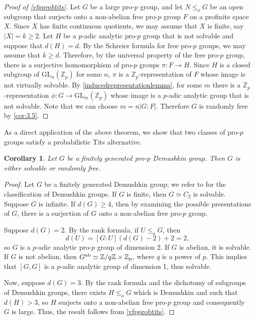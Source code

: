 \documentclass[a4paper,10pt]{amsart}
\theoremstyle{plain}
\newtheorem{corollary}[thm]{Corollary}
\theoremstyle{definition}
\newcommand{\bbZ}{\mathbb{Z}}
\numberwithin{equation}{section}
\begin{document}
\begin{proof}[Proof of \cref{vfpprobtits}]
    Let $G$ be a large pro-$p$ group, and let $N\leq_o G$ be an open subgroup that surjects onto a non-abelian free pro-$p$ group $F$ on a profinite space $X$. Since $X$ has finite continuous quotients, we may assume that $X$ is finite, say $|X|=k\geq 2$.
    Let $H$ be a $p$-adic analytic pro-$p$ group that is not solvable and suppose that $d(H)=d$.   By the Schreier formula for free pro-$p$ groups, we may assume that $k\geq d$. Therefore, by the universal property of the free pro-$p$ group,  there is a surjective homomorphism of pro-$p$ groups $\pi\colon F\to H$. Since $H$ is a closed subgroup of $\mathrm{GL}_n(\bbZ_p)$ for some $n$, $\pi$ is a $\bbZ_p$-representation of $F$ whose image is not virtually solvable. By \cref{inducedrepresentationlemma}, for some $m$ there is a $\bbZ_p$-representation $\phi\colon G\to \mathrm{GL}_m(\bbZ_p)$ whose image is a $p$-adic analytic group that is not solvable. Note that we can choose $m=n|G:F|$. Therefore $G$ is randomly free by \cref{cor:3.5}.	
\end{proof}

As a direct application of the above theorem, we show that two classes of pro-$p$ groups satisfy a probabilistic Tits alternative.

\begin{corollary}\label{cor:demushkin}
    Let $G$ be a finitely generated pro-$p$ Demushkin group. Then $G$ is either solvable or randomly free.
\end{corollary}

\begin{proof}
    Let $G$ be a finitely generated Demushkin group; we refer to \cite{Lab67} for the classification of Demushkin groups. If $G$ is finite, then $G \simeq C_2$ is solvable. Suppose $G$ is infinite. If $d(G) \geq 4$, then by examining the possible presentations of $G$, there is a surjection of $G$ onto a non-abelian free pro-$p$ group. 
    
    Suppose $d(G)=2$. By the rank formula, if $U \leq_o G$, then
    \[d(U) = [G:U](d(G) - 2)+2 = 2,\]
    so $G$ is a $p$-adic analytic pro-$p$ group of dimension 2. If $G$ is abelian, it is solvable. If $G$ is not abelian, then $G^{\rm{ab}} \simeq \bbZ/q\bbZ \times \bbZ_p$, where $q$ is a power of $p$. This implies that $[G,G]$ is a $p$-adic analytic group of dimension 1, thus solvable. 
    
    Now, suppose $d(G)=3$. By the rank formula and the dichotomy of subgroups of Demushkin groups, there exists $H\leq_o G$ which is Demushkin and such that $d(H)>3$, so $H$ surjects onto a non-abelian free pro-$p$ group and consequently $G$ is large. Thus, the result follows from \cref{vfpprobtits}.
\end{proof}
\end{document}
